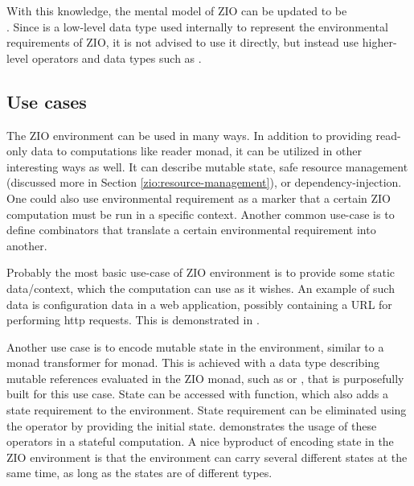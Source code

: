 

With this knowledge, the mental model of ZIO can be updated to be \\. Since  is a low-level data type used internally to represent the environmental requirements of ZIO, it is not advised to use it directly, but instead use higher-level operators and data types such as .


\subsection{Use cases}
The ZIO environment can be used in many ways. In addition to providing read-only data to computations like reader monad, it can be utilized in other interesting ways as well. It can describe mutable state, safe resource management (discussed more in Section \ref{zio:resource-management}), or dependency-injection. One could also use environmental requirement as a marker that a certain ZIO computation must be run in a specific context. Another common use-case is to define combinators that translate a certain environmental requirement into another.

Probably the most basic use-case of ZIO environment is to provide some static data/context, which the computation can use as it wishes. An example of such data is configuration data in a web application, possibly containing a URL for performing http requests. This is demonstrated in .



Another use case is to encode mutable state in the environment, similar to a monad transformer for  monad. This is achieved with a data type describing mutable references evaluated in the ZIO monad, such as  or , that is purposefully built for this use case. State can be accessed with  function, which also adds a state requirement to the environment. State requirement can be eliminated using the  operator by providing the initial state.  demonstrates the usage of these operators in a stateful computation. A nice byproduct of encoding state in the ZIO environment is that the environment can carry several different states at the same time, as long as the states are of different types.



